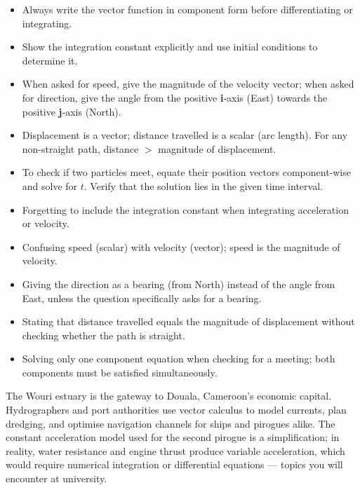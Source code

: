 \documentclass[11pt]{article}
\begin{document}
\begin{aretenir}
\begin{itemize}
    \item Always write the vector function in component form before differentiating or integrating.
    \item Show the integration constant explicitly and use initial conditions to determine it.
    \item When asked for speed, give the magnitude of the velocity vector; when asked for direction, give the angle from the positive \textbf{i}‑axis (East) towards the positive \textbf{j}‑axis (North).
    \item Displacement is a vector; distance travelled is a scalar (arc length). For any non‑straight path, distance $>$ magnitude of displacement.
    \item To check if two particles meet, equate their position vectors component‑wise and solve for $t$. Verify that the solution lies in the given time interval.
\end{itemize}
\end{aretenir}

\begin{attention}
\begin{itemize}
    \item Forgetting to include the integration constant when integrating acceleration or velocity.
    \item Confusing speed (scalar) with velocity (vector); speed is the magnitude of velocity.
    \item Giving the direction as a bearing (from North) instead of the angle from East, unless the question specifically asks for a bearing.
    \item Stating that distance travelled equals the magnitude of displacement without checking whether the path is straight.
    \item Solving only one component equation when checking for a meeting; both components must be satisfied simultaneously.
\end{itemize}
\end{attention}

\begin{savaistu}
The Wouri estuary is the gateway to Douala, Cameroon's economic capital. Hydrographers and port authorities use vector calculus to model currents, plan dredging, and optimise navigation channels for ships and pirogues alike. The constant acceleration model used for the second pirogue is a simplification; in reality, water resistance and engine thrust produce variable acceleration, which would require numerical integration or differential equations — topics you will encounter at university.
\end{savaistu}
\end{document}
